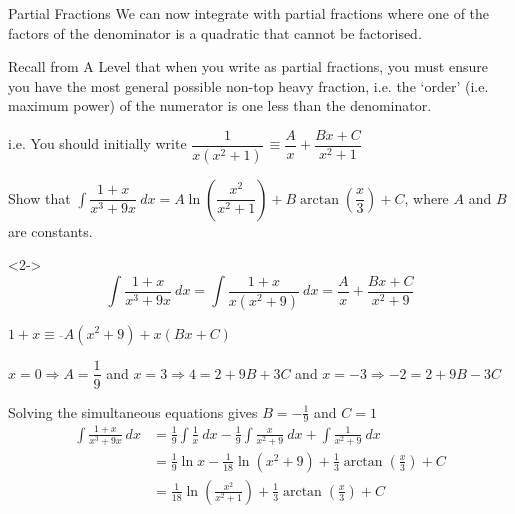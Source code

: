 \documentclass[8pt]{beamer}
\begin{document}
	\begin{frame}[shrink]{Partial Fractions}
		We can now integrate with partial fractions where one of the factors of the denominator is a quadratic that cannot be factorised.
		
		\alert{Recall from A Level that when you write as partial fractions, you must ensure you have the most general possible non-top heavy fraction, i.e. the ‘order’ (i.e. maximum power) of the numerator is one less than the denominator.}
		
		i.e. You should initially write $\dfrac{1}{x\left( x^{2}+1\right) }\dfrac{}{}\equiv \dfrac{A}{x}+\dfrac{Bx+C}{x^{2}+1}$
		
		\begin{problem}
			Show that $\int \dfrac{1+x}{x^{3}+9x}\ dx=A\ln \left( \dfrac{x^{2}}{x^{2}+1}\right) +B\arctan \left( \dfrac{x}{3}\right) +C$, where $A$ and $B$ are constants.
		\end{problem}
		\begin{solution}<2->
			\[ \int \dfrac{1+x}{x^{3}+9x}\ dx = \int \dfrac{1+x}{x(x^{2}+9)}\ dx = \dfrac{A}{x}+\dfrac{Bx+C}{x^{2}+9} \]
			
			$1+x\equiv \overline{}A\left( x^{2}+9\right) +x\left( Bx+C\right)$
			
			$x=0\Rightarrow A=\dfrac{1}{9}$ and $x=3\Rightarrow 4=2+9B+3C$ and $x=-3 \Rightarrow -2 = 2 +9B - 3C$
			
			Solving the simultaneous equations gives $B = -\frac{1}{9}$ and $C = 1$
			\begin{align*}
			\int \frac{1+x}{x^{3}+9x}\ dx &= \frac{1}{9} \int \frac{1}{x}\ dx - \frac{1}{9}\int\frac{x}{x^{2}+9}\ dx + \int \frac{1}{x^{2}+9}\ dx \\
			&= \frac{1}{9}\ln x-\frac{1}{18}\ln \left( x^{2}+9\right) +\frac{1}{3}\arctan \left( \frac{x}{3}\right) +C \\	
			&= \frac{1}{18}\ln \left( \frac{x^{2}}{x^{2}+1}\right) +\frac{1}{3}\arctan \left( \frac{x}{3}\right) +C \\
			\end{align*}
		\end{solution}
		
	\end{frame}
	
\end{document}
